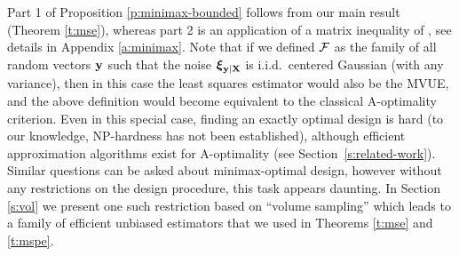 \documentclass[12pt]{sty/colt2019/colt2018-arxiv}
\begin{document}
\vspace{-1mm}
Part 1 of Proposition \ref{p:minimax-bounded} follows from our main result (Theorem \ref{t:mse}), whereas part 2 is an application of a
matrix inequality of \cite{avron-boutsidis13}, see details in Appendix \ref{a:minimax}. Note that if we defined $\mathcal{F}$ as the family of all
random vectors $\mathbf y$ such that the noise  $\boldsymbol\xi_{\mathbf y|\mathbf X}$ is
i.i.d.~centered Gaussian (with any variance), then in this case the
least squares estimator would also be the MVUE, and the above
definition would become equivalent to the classical A-optimality criterion.
Even in this special case, finding an exactly optimal design is hard
(to our knowledge, NP-hardness has not been established),
although efficient approximation algorithms exist for A-optimality
(see Section~\ref{s:related-work}). Similar questions can be asked
about minimax-optimal design, however without any
restrictions on the design procedure, this task appears daunting. In
Section \ref{s:vol} we present one such restriction based on
``volume sampling'' which leads to a family of efficient
unbiased estimators that we used in Theorems \ref{t:mse} and
\ref{t:mspe}.

\end{document}

